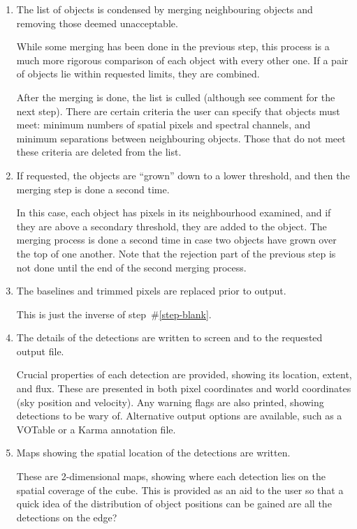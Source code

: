 \begin{enumerate}
\item The list of objects is condensed by merging neighbouring objects
  and removing those deemed unacceptable.

  While some merging has been done in the previous step, this process
  is a much more rigorous comparison of each object with every other
  one. If a pair of objects lie within requested limits, they are
  combined. 

  After the merging is done, the list is culled (although see comment
  for the next step). There are certain criteria the user can specify
  that objects must meet: minimum numbers of spatial pixels and
  spectral channels, and minimum separations between neighbouring
  objects. Those that do not meet these criteria are deleted
  from the list.

\item If requested, the objects are ``grown'' down to a lower
  threshold, and then the merging step is done a second time.

  In this case, each object has pixels in its neighbourhood examined,
  and if they are above a secondary threshold, they are added to the
  object. The merging process is done a second time in case two
  objects have grown over the top of one another. Note that the
  rejection part of the previous step is not done until the end of the
  second merging process.

\item The baselines and trimmed pixels are replaced prior to output.

  This is just the inverse of step~\#\ref{step-blank}.

\item The details of the detections are written to screen and to the
  requested output file.

  Crucial properties of each detection are provided, showing its
  location, extent, and flux. These are presented in both pixel
  coordinates and world coordinates (\eg sky position and
  velocity). Any warning flags are also printed, showing detections to
  be wary of. Alternative output options are available, such as a
  VOTable or a Karma annotation file.

\item Maps showing the spatial location of the detections are written.

  These are 2-dimensional maps, showing where each detection lies on
  the spatial coverage of the cube. This is provided as an aid to the
  user so that a quick idea of the distribution of object positions
  can be gained \eg are all the detections on the edge?


\end{enumerate}
